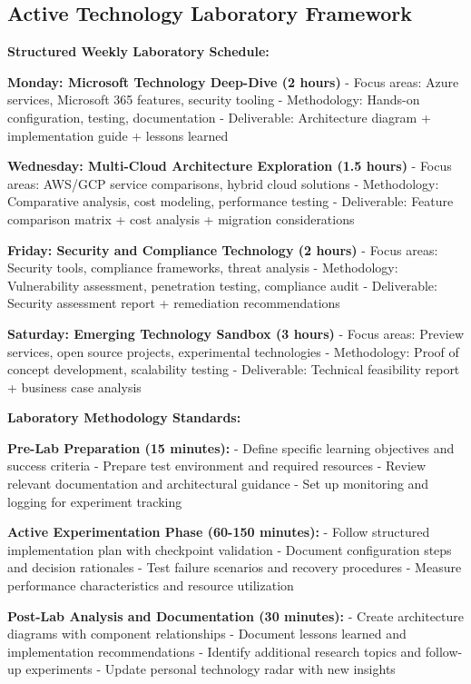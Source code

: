 \documentclass[
  letterpaper,
  DIV=11,
  numbers=noendperiod]{scrartcl}
\begin{document}
\subsection{Active Technology Laboratory
Framework}\label{active-technology-laboratory-framework}

\textbf{Structured Weekly Laboratory Schedule:}

\textbf{Monday: Microsoft Technology Deep-Dive (2 hours)} - Focus areas:
Azure services, Microsoft 365 features, security tooling - Methodology:
Hands-on configuration, testing, documentation - Deliverable:
Architecture diagram + implementation guide + lessons learned

\textbf{Wednesday: Multi-Cloud Architecture Exploration (1.5 hours)} -
Focus areas: AWS/GCP service comparisons, hybrid cloud solutions -
Methodology: Comparative analysis, cost modeling, performance testing -
Deliverable: Feature comparison matrix + cost analysis + migration
considerations

\textbf{Friday: Security and Compliance Technology (2 hours)} - Focus
areas: Security tools, compliance frameworks, threat analysis -
Methodology: Vulnerability assessment, penetration testing, compliance
audit - Deliverable: Security assessment report + remediation
recommendations

\textbf{Saturday: Emerging Technology Sandbox (3 hours)} - Focus areas:
Preview services, open source projects, experimental technologies -
Methodology: Proof of concept development, scalability testing -
Deliverable: Technical feasibility report + business case analysis

\textbf{Laboratory Methodology Standards:}

\textbf{Pre-Lab Preparation (15 minutes):} - Define specific learning
objectives and success criteria - Prepare test environment and required
resources - Review relevant documentation and architectural guidance -
Set up monitoring and logging for experiment tracking

\textbf{Active Experimentation Phase (60-150 minutes):} - Follow
structured implementation plan with checkpoint validation - Document
configuration steps and decision rationales - Test failure scenarios and
recovery procedures - Measure performance characteristics and resource
utilization

\textbf{Post-Lab Analysis and Documentation (30 minutes):} - Create
architecture diagrams with component relationships - Document lessons
learned and implementation recommendations - Identify additional
research topics and follow-up experiments - Update personal technology
radar with new insights
\end{document}
